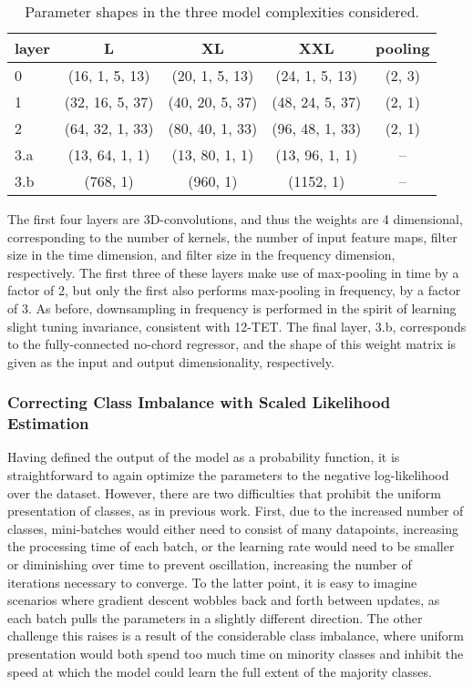 \begin{table}[t]
\begin{center}
\caption{Parameter shapes in the three model complexities considered.}
\label{tab:lvce_archs}
\begin{tabular}{l | c | c | c | c }
layer & L & XL & XXL & pooling\\
\hline
0   & (16,  1, 5, 13) & (20,  1, 5, 13) & (24,  1, 5, 13) & (2, 3) \\
1   & (32, 16, 5, 37) & (40, 20, 5, 37) & (48, 24, 5, 37) & (2, 1) \\
2   & (64, 32, 1, 33) & (80, 40, 1, 33) & (96, 48, 1, 33) & (2, 1) \\
3.a & (13, 64, 1,  1) & (13, 80, 1,  1) & (13, 96, 1,  1) &   --   \\
3.b &    (768, 1)     &     (960, 1)    &    (1152, 1)    &   --   \\
\hline
\end{tabular}
\end{center}
\end{table}

The first four layers are 3D-convolutions, and thus the weights are 4 dimensional, corresponding to the number of kernels, the number of input feature maps, filter size in the time dimension, and filter size in the frequency dimension, respectively.
The first three of these layers make use of max-pooling in time by a factor of 2, but only the first also performs max-pooling in frequency, by a factor of 3.
As before, downsampling in frequency is performed in the spirit of learning slight tuning invariance, consistent with 12-TET.
The final layer, 3.b, corresponds to the fully-connected no-chord regressor, and the shape of this weight matrix is given as the input and output dimensionality, respectively.


\subsubsection{Correcting Class Imbalance with Scaled Likelihood Estimation}
\label{subsubsec:scaled_likelihood_estimation}
Having defined the output of the model as a probability function, it is straightforward to again optimize the parameters to the negative log-likelihood over the dataset.
However, there are two difficulties that prohibit the uniform presentation of classes, as in previous work.
First, due to the increased number of classes, mini-batches would either need to consist of many datapoints, increasing the processing time of each batch, or the learning rate would need to be smaller or diminishing over time to prevent oscillation, increasing the number of iterations necessary to converge.
To the latter point, it is easy to imagine scenarios where gradient descent wobbles back and forth between updates, as each batch pulls the parameters in a slightly different direction.
The other challenge this raises is a result of the considerable class imbalance, where uniform presentation would both spend too much time on minority classes and inhibit the speed at which the model could learn the full extent of the majority classes.

